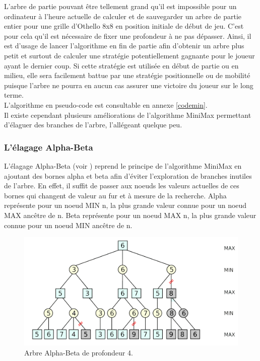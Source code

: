 \documentclass[a4paper,12pt]{report}
\begin{document}
L'arbre de partie pouvant être tellement grand qu'il est impossible pour un ordinateur à l'heure actuelle de calculer et de sauvegarder un arbre de partie entier pour une grille d'Othello 8x8 en position initiale de début de jeu. C'est pour cela qu'il est nécessaire de fixer une profondeur à ne pas dépasser. Ainsi, il est d'usage de lancer l'algorithme en fin de partie afin d'obtenir un arbre plus petit et surtout de calculer une stratégie potentiellement gagnante pour le joueur ayant le dernier coup. Si cette stratégie est utilisée en début de partie ou en milieu, elle sera facilement battue par une stratégie positionnelle ou de mobilité puisque l'arbre ne pourra en aucun cas assurer une victoire du joueur sur le long terme.\\

L'algorithme en pseudo-code est consultable en annexe \ref{codemin}.\\

Il existe cependant plusieurs améliorations de l'algorithme MiniMax permettant d'élaguer des branches de l'arbre, l'allégeant quelque peu.


\subsubsection{L'élagage Alpha-Beta}

L'élagage Alpha-Beta (voir \cite{1}) reprend le principe de l'algorithme MiniMax en ajoutant des bornes alpha et beta afin d'éviter l'exploration de branches inutiles de l'arbre. En effet, il suffit de passer aux noeuds les valeurs actuelles de ces bornes qui changent de valeur au fur et à mesure de la recherche. Alpha représente pour un noeud MIN n, la plus grande valeur connue pour un noeud MAX ancêtre de n. Beta représente pour un noeud MAX n, la plus grande valeur connue pour un noeud MIN ancêtre de n.

\begin{figure}[H]
\centering
\includegraphics[scale=0.3]{Images/alphabeta.png}
\caption{Arbre Alpha-Beta de profondeur 4.}
\label{alphabet}
\end{figure}
\end{document}

